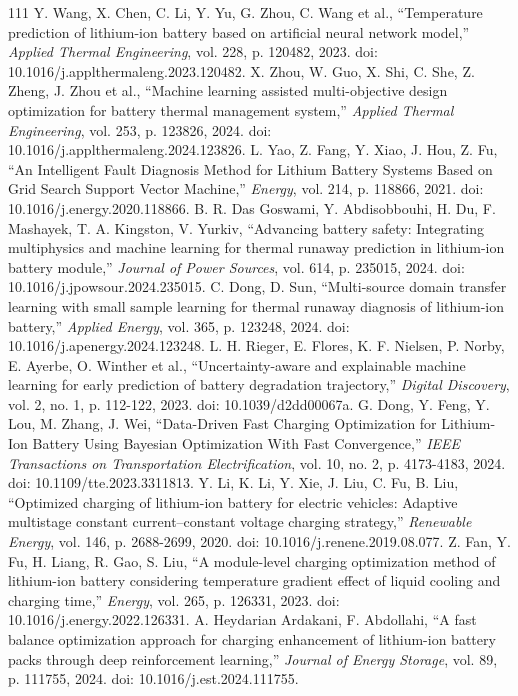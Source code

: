\documentclass[journal]{IEEEtran}
\begin{document}
\begin{thebibliography}{111}
Y. Wang, X. Chen, C. Li, Y. Yu, G. Zhou, C. Wang et al., ``Temperature prediction of lithium-ion battery based on artificial neural network model,'' \emph{Applied Thermal Engineering}, vol. 228, p. 120482, 2023. doi: 10.1016/j.applthermaleng.2023.120482.
X. Zhou, W. Guo, X. Shi, C. She, Z. Zheng, J. Zhou et al., ``Machine learning assisted multi-objective design optimization for battery thermal management system,'' \emph{Applied Thermal Engineering}, vol. 253, p. 123826, 2024. doi: 10.1016/j.applthermaleng.2024.123826.
L. Yao, Z. Fang, Y. Xiao, J. Hou, Z. Fu, ``An Intelligent Fault Diagnosis Method for Lithium Battery Systems Based on Grid Search Support Vector Machine,'' \emph{Energy}, vol. 214, p. 118866, 2021. doi: 10.1016/j.energy.2020.118866.
B. R. Das Goswami, Y. Abdisobbouhi, H. Du, F. Mashayek, T. A. Kingston, V. Yurkiv, ``Advancing battery safety: Integrating multiphysics and machine learning for thermal runaway prediction in lithium-ion battery module,'' \emph{Journal of Power Sources}, vol. 614, p. 235015, 2024. doi: 10.1016/j.jpowsour.2024.235015.
C. Dong, D. Sun, ``Multi-source domain transfer learning with small sample learning for thermal runaway diagnosis of lithium-ion battery,'' \emph{Applied Energy}, vol. 365, p. 123248, 2024. doi: 10.1016/j.apenergy.2024.123248.
L. H. Rieger, E. Flores, K. F. Nielsen, P. Norby, E. Ayerbe, O. Winther et al., ``Uncertainty-aware and explainable machine learning for early prediction of battery degradation trajectory,'' \emph{Digital Discovery}, vol. 2, no. 1, p. 112-122, 2023. doi: 10.1039/d2dd00067a.
G. Dong, Y. Feng, Y. Lou, M. Zhang, J. Wei, ``Data-Driven Fast Charging Optimization for Lithium-Ion Battery Using Bayesian Optimization With Fast Convergence,'' \emph{IEEE Transactions on Transportation Electrification}, vol. 10, no. 2, p. 4173-4183, 2024. doi: 10.1109/tte.2023.3311813.
Y. Li, K. Li, Y. Xie, J. Liu, C. Fu, B. Liu, ``Optimized charging of lithium-ion battery for electric vehicles: Adaptive multistage constant current--constant voltage charging strategy,'' \emph{Renewable Energy}, vol. 146, p. 2688-2699, 2020. doi: 10.1016/j.renene.2019.08.077.
Z. Fan, Y. Fu, H. Liang, R. Gao, S. Liu, ``A module-level charging optimization method of lithium-ion battery considering temperature gradient effect of liquid cooling and charging time,'' \emph{Energy}, vol. 265, p. 126331, 2023. doi: 10.1016/j.energy.2022.126331.
A. Heydarian Ardakani, F. Abdollahi, ``A fast balance optimization approach for charging enhancement of lithium-ion battery packs through deep reinforcement learning,'' \emph{Journal of Energy Storage}, vol. 89, p. 111755, 2024. doi: 10.1016/j.est.2024.111755.

\end{thebibliography}
\end{document}
